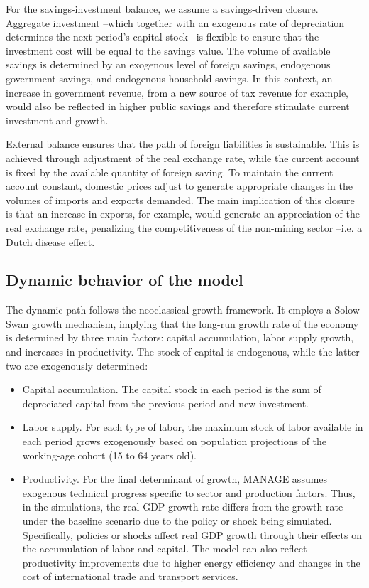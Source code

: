 \documentclass[11pt,english]{article}
\begin{document}
For the savings-investment balance, we assume a savings-driven closure. Aggregate investment --which together with an exogenous rate of depreciation determines the next period's capital stock-- is flexible to ensure that the investment cost will be equal to the savings value. The volume of available savings is determined by an exogenous level of foreign savings, endogenous government savings, and endogenous household savings. In this context, an increase in government revenue, from a new source of tax revenue for example, would also be reflected in higher public savings and therefore stimulate current investment and growth.

External balance ensures that the path of foreign liabilities is sustainable. This is achieved through adjustment of the real exchange rate, while the current account is fixed by the available quantity of foreign saving. To maintain the current account constant, domestic prices adjust to generate appropriate changes in the volumes of imports and exports demanded. The main implication of this closure is that an increase in exports, for example, would generate an appreciation of the real exchange rate, penalizing the competitiveness of the non-mining sector --i.e. a Dutch disease effect.

\subsection{Dynamic behavior of the model}

The dynamic path follows the neoclassical growth framework. It employs a Solow-Swan growth mechanism, implying that the long-run growth rate of the economy is determined by three main factors: capital accumulation, labor supply growth, and increases in productivity. The stock of capital is endogenous, while the latter two are exogenously determined:
\begin{itemize}
	\item Capital accumulation. The capital stock in each period is the sum of depreciated capital from the previous period and new investment.
	\item Labor supply. For each type of labor, the maximum stock of labor available in each period grows exogenously based on population projections of the working-age cohort (15 to 64 years old).

	\item Productivity. For the final determinant of growth, MANAGE assumes exogenous technical progress specific to sector and production factors. Thus, in the simulations, the real GDP growth rate differs from the growth rate under the baseline scenario due to the policy or shock being simulated. Specifically, policies or shocks affect real GDP growth through their effects on the accumulation of labor and capital. The model can also reflect productivity improvements due to higher energy efficiency and changes in the cost of international trade and transport services.
\end{itemize}
\end{document}
